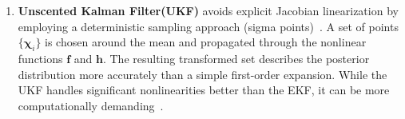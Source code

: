 \begin{enumerate}
    \item \textbf{Unscented Kalman Filter(UKF)} avoids explicit Jacobian linearization by employing a deterministic sampling approach (sigma points)~\cite{julier1997new}. A set of points $\{\boldsymbol{\chi}_i\}$ is chosen around the mean and propagated through the nonlinear functions $\mathbf{f}$ and $\mathbf{h}$. The resulting transformed set describes the posterior distribution more accurately than a simple first-order expansion. While the UKF handles significant nonlinearities better than the EKF, it can be more computationally demanding~\cite{thrun2005probabilistic}.

    
\end{enumerate}




